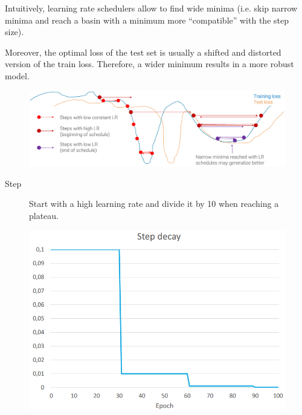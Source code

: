 \begin{remark}
    Intuitively, learning rate schedulers allow to find wide minima (i.e. skip narrow minima and reach a basin with a minimum more ``compatible'' with the step size).

    Moreover, the optimal loss of the test set is usually a shifted and distorted version of the train loss. Therefore, a wider minimum results in a more robust model.

    \begin{figure}[H]
        \centering
        \includegraphics[width=0.9\linewidth]{./img/_lr_schedule_steps.pdf}
    \end{figure}
\end{remark}

\begin{minipage}{0.6\linewidth}
    \begin{description}
        \item[Step]
            Start with a high learning rate and divide it by 10 when reaching a plateau.
    \end{description}
\end{minipage}
\begin{minipage}{0.35\linewidth}
    \begin{figure}[H]
        \centering
        \includegraphics[width=0.9\linewidth]{./img/lr_schedule_step.png}
    \end{figure}
\end{minipage}

